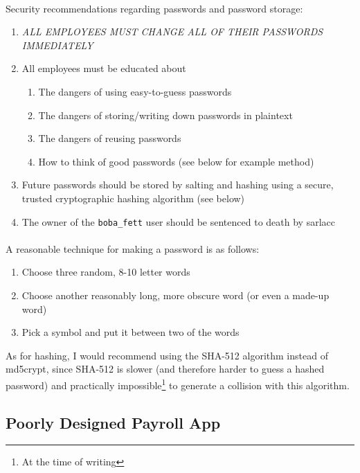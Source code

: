 \documentclass{article}
\begin{document}
\paragraph{}
\begin{adjustwidth}{1.5cm}{1.5cm}
	Security recommendations regarding passwords and password storage:
	\begin{enumerate}
		\item \emph{ALL EMPLOYEES MUST CHANGE ALL OF THEIR PASSWORDS IMMEDIATELY}
		\item All employees must be educated about
		\begin{enumerate}
			\item The dangers of using easy-to-guess passwords
			\item The dangers of storing/writing down passwords in plaintext
			\item The dangers of reusing passwords
			\item How to think of good passwords (see below for example method)
		\end{enumerate}
		\item Future passwords should be stored by salting and hashing using a secure, trusted cryptographic hashing algorithm (see below)
		\item The owner of the \texttt{boba\_fett} user should be sentenced to death by sarlacc
	\end{enumerate}
\end{adjustwidth}

\paragraph{}
A reasonable technique for making a password is as follows:
\begin{enumerate}
	\item Choose three random, 8-10 letter words
	\item Choose another reasonably long, more obscure word (or even a made-up word)
	\item Pick a symbol and put it between two of the words
\end{enumerate}
As for hashing, I would recommend using the SHA-512 algorithm instead of md5crypt, since SHA-512 is slower (and therefore harder to guess a hashed password) and practically impossible\footnote{At the time of writing} to generate a collision with this algorithm.

\subsection{Poorly Designed Payroll App}
\label{subsec:payroll_app}
\end{document}
